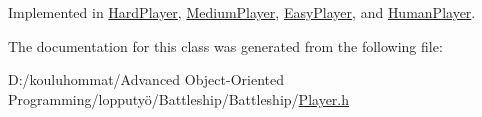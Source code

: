 Implemented in \mbox{\hyperlink{class_hard_player_aa8977ca3294daf996707bd0ff434d69e}{Hard\+Player}}, \mbox{\hyperlink{class_medium_player_aeadd8498cba5c447afbb5a0eb7408285}{Medium\+Player}}, \mbox{\hyperlink{class_easy_player_a254a5ddcd421e1dc71e45125e7ab04d8}{Easy\+Player}}, and \mbox{\hyperlink{class_human_player_a19be81244b7a1c88a3ca89d207055b6e}{Human\+Player}}.



The documentation for this class was generated from the following file\+:\begin{DoxyCompactItemize}
\item 
D\+:/kouluhommat/\+Advanced Object-\/\+Oriented Programming/lopputyö/\+Battleship/\+Battleship/\mbox{\hyperlink{_player_8h}{Player.\+h}}\end{DoxyCompactItemize}
